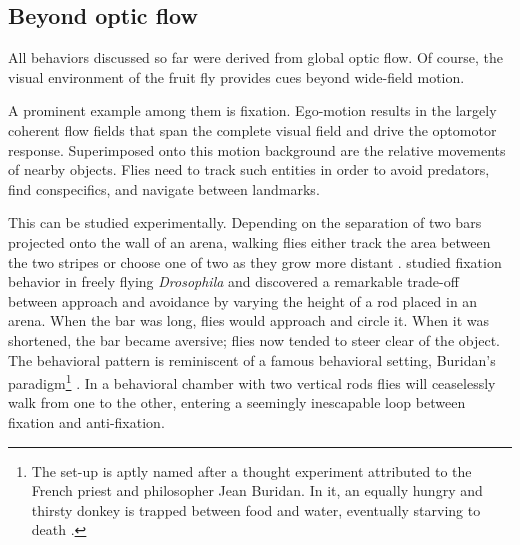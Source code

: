 \subsection{Beyond optic flow}

All behaviors discussed so far were derived from global optic flow. Of course, the visual environment of the fruit fly provides cues beyond wide-field motion.

A prominent example among them is fixation. Ego-motion results in the largely coherent flow fields that span the complete visual field and drive the optomotor response. Superimposed onto this motion background are the relative movements of nearby objects. Flies need to track such entities in order to avoid predators, find conspecifics, and navigate between landmarks.

This can be studied experimentally. Depending on the separation of two bars projected onto the wall of an arena, walking flies either track the area between the two stripes or choose one of two as they grow more distant \citep{Horn:1975aa}. \citet{Maimon:2008go} studied fixation behavior in freely flying \textit{Drosophila} and discovered a remarkable trade-off between approach and avoidance by varying the height of a rod placed in an arena. When the bar was long, flies would approach and circle it. When it was shortened, the bar became aversive; flies now tended to steer clear of the object. The behavioral pattern is reminiscent of a famous behavioral setting, Buridan's paradigm\footnote{The set-up is aptly named after a thought experiment attributed to the French priest and philosopher Jean Buridan. In it, an equally hungry and thirsty donkey is trapped between food and water, eventually starving to death \citep{Knowles}.} \citep{Buelthoff:1982aa}. In a behavioral chamber with two vertical rods flies will ceaselessly walk from one to the other, entering a seemingly inescapable loop between fixation and anti-fixation.

